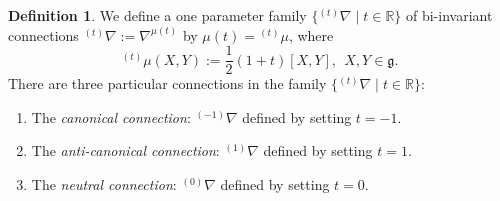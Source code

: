 \documentclass[12pt]{amsart}
\theoremstyle{definition}
\newtheorem{Definition}{Definition}[section]
\theoremstyle{remark}
\numberwithin{equation}{section}
\begin{document}
\begin{Definition}\label{def:threeconnections}
 We define a one parameter family 
 $\{ {}^{(t)}\nabla \;| \;t\in \mathbb{R}\}$ of 
 bi-invariant connections  ${{}^{(t)} \nabla}:=\nabla^{\mu(t)}$ by
 $\mu(t)={}^{(t)}\mu$, where
\begin{equation}\label{eq:familyconnection}
 
 {}^{(t)}\mu(X,Y):=\frac{1}{2}(1+t) [X, Y],\ \  X,Y \in \mathfrak{g}.
 
\end{equation}
 There are three particular connections in 
 the family $\{{{}^{(t)} \nabla}\; |\;t \in \mathbb R\}$:
\begin{enumerate}
\item  The \textit{canonical connection}:  ${}^{(-1)}\nabla $ \hspace{2mm} defined by setting  $t =- 1$.

\item The \textit{anti-canonical connection}: ${}^{(1)}\nabla $\hspace{2mm} defined 
 by setting $t =1$. 

\item The \textit{neutral connection}: ${}^{(0)}\nabla $ \hspace{2mm}defined by setting  $t =0$.
\end{enumerate} 
\end{Definition}
\end{document}
